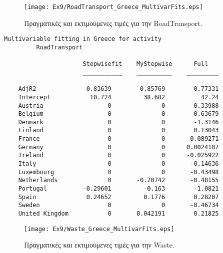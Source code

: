 \documentclass[11pt]{scrartcl} %
\begin{document}
\begin{figure}[H]
 
	\centering
	\texttt{[image: Ex9/RoadTransport\_Greece\_MultivarFits.eps]}	
\caption{Πραγματικές και εκτιμούμενες τιμές για την RoadTransport.}
\label{fig:z99}
\end{figure}



\begin{Verbatim}[fontsize=\small]
Multivariable fitting in Greece for activity
 	 	 RoadTransport

                      Stepwisefit    MyStepwise      Full   
                      ___________    __________    _________

    AdjR2              0.83639        0.85769        0.77331
    Intercept           10.724         38.682          42.24
    Austria                  0              0        0.33988
    Belgium                  0              0        0.63679
    Denmark                  0              0        -1.3146
    Finland                  0              0        0.13043
    France                   0              0       0.089271
    Germany                  0              0      0.0024107
    Ireland                  0              0      -0.025922
    Italy                    0              0       -0.14636
    Luxembourg               0              0       -0.43498
    Netherlands              0       -0.20742       -0.48155
    Portugal          -0.29601         -0.163        -1.0821
    Spain              0.24652         0.1776        0.28207
    Sweden                   0              0       -0.46734
    United Kingdom           0       0.042191        0.21825
\end{Verbatim}



\begin{figure}[H]

	\centering
	\texttt{[image: Ex9/Waste\_Greece\_MultivarFits.eps]}	
\caption{Πραγματικές και εκτιμούμενες τιμές για την Waste.}
\label{fig:z910} 
\end{figure}
\end{document}
